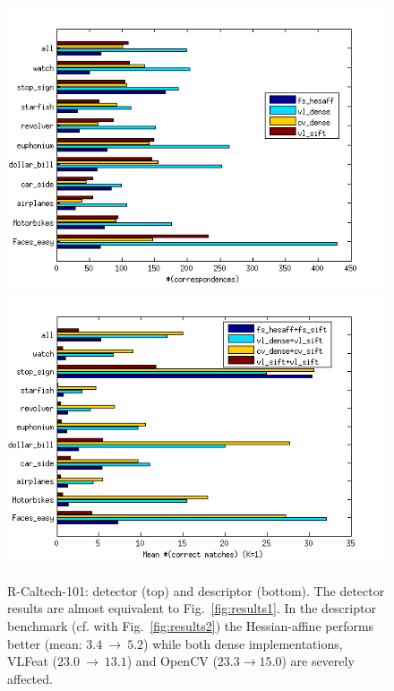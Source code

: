 \documentclass[10pt,journal,cspaper,compsoc]{IEEEtran}
\begin{document}
\begin{figure}
  \begin{center}
    \includegraphics[width=0.9\linewidth]{resources/antti_results/r_caltech101_Results/Detector/AvgNumOfCorr.png}\\
    \includegraphics[width=0.9\linewidth]{resources/antti_results/r_caltech101_Results/Descriptor/descMeanCorr.png}
\caption{R-Caltech-101: detector (top) and descriptor (bottom).
The detector results are almost equivalent to Fig.~\ref{fig:results1}.
In the descriptor benchmark (cf. with Fig.~\ref{fig:results2}) the
Hessian-affine performs better
(mean: $3.4~\rightarrow~5.2$) while both dense implementations,
VLFeat ($23.0~\rightarrow~13.1$) and OpenCV ($23.3\rightarrow 15.0$) are
severely affected.}
\label{fig:rcaltechcomparison}
\end{center}
\end{figure}
\end{document}
